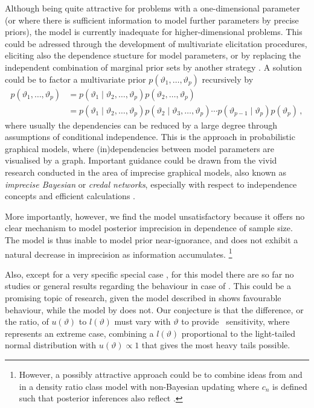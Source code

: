 Although being quite attractive for problems with a one-dimensional parameter
(or where there is sufficient information to model further parameters by precise priors),
the model is currently inadequate for higher-dimensional problems.
This could be adressed through the development of multivariate elicitation procedures,
eliciting also the dependence stucture for model parameters,
or by replacing the independent combination of marginal prior sets
by another strategy \parencite[as mentioned in][\S 5.2]{2011:rinderknecht:diss}.
A solution could be to factor a multivariate prior $p(\vartheta_1,\ldots,\vartheta_p)$
recursively by
\begin{align*}
p(\vartheta_1,\ldots,\vartheta_p)
 &= p(\vartheta_1\mid \vartheta_2,\ldots,\vartheta_p) p(\vartheta_2,\ldots,\vartheta_p) \\
 &= p(\vartheta_1\mid \vartheta_2,\ldots,\vartheta_p) p(\vartheta_2\mid \vartheta_3,\ldots,\vartheta_p)
    \cdots p(\vartheta_{p-1}\mid\vartheta_p) p(\vartheta_p)\,,
\end{align*}
where usually the dependencies can be reduced by a large degree through assumptions of conditional independence.
This is the approach in probabilistic graphical models,
where (in)dependencies between model parameters are visualised by a graph.
Important guidance could be drawn from the vivid research conducted in the area
of imprecise graphical models, also known as \emph{imprecise Bayesian} or \emph{credal networks},
especially with respect to independence concepts and efficient calculations
\parencite[for a recent overview, see][]{itip-ipgms}.

More importantly, however, we find the model unsatisfactory because it offers no clear mechanism %
to model posterior imprecision in dependence of sample size. %
The model is thus inable to model prior near-ignorance, and does not exhibit
a natural decrease in imprecision as information accumulates.%
\footnote{However, a possibly attractive approach could be to
combine ideas from \textcite{1993:coolen} and \textcite{2011:rinderknecht:diss}
in a density ratio class model with non-Bayesian updating
where $c_n$ is defined such that posterior inferences also reflect \pdc.}

Also, except for a very specific special case \parencite[\S 4.3, as discussed above]{1991:pericchi},
for this model there are so far no studies or general results regarding the behaviour in case of \pdc.
This could be a promising topic of research,
given the model described in \textcite[\S 4.3]{1991:pericchi} shows favourable behaviour,
while the model by \textcite{1993:coolen} does not.
Our conjecture is that the difference, or the ratio, of $u(\vartheta)$ to $l(\vartheta)$
must vary with $\vartheta$ to provide \pdc\ sensitivity,
where \textcite[\S 4.3]{1991:pericchi} represents an extreme case,
combining a $l(\vartheta)$ proportional to the light-tailed normal distribution %
with $u(\vartheta) \propto 1$ that gives the most heavy tails possible.

